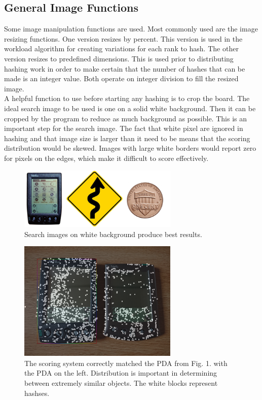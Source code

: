 \documentclass[10pt, journal]{vgtc}                %
\newcommand\tab[1][1cm]{\hspace*{#1}}
\begin{document}
\subsection{General Image Functions}

\tab Some image manipulation functions are used. Most commonly used are the image resizing functions. One version resizes by percent. This version is used in the workload algorithm for creating variations for each rank to hash. The other version resizes to predefined dimensions. This is used prior to distributing hashing work in order to make certain that the number of hashes that can be made is an integer value. Both operate on integer division to fill the resized image.\smallskip \\
\tab A helpful function to use before starting any hashing is to crop the board. The ideal search image to be used is one on a solid white background. Then it can be cropped by the program to reduce as much background as possible. This is an important step for the search image. The fact that white pixel are ignored in hashing and that image size is larger than it need to be means that the scoring distribution would be skewed. Images with large white borders would report zero for pixels on the edges, which make it difficult to score effectively.
\begin{figure}[h!]
	\centering
	\includegraphics[width=3in]{palm3.png}
	\caption{Search images on white background produce best results.}
\end{figure}

\begin{figure}[h!]
	\centering
	\includegraphics[width=3.0in]{overlay_pda.png}
	\caption[White boxes represent hash blocks]{The scoring system correctly matched the PDA from Fig. 1. with the PDA on the left. Distribution is important in determining between extremely similar objects. The white blocks represent hashses.}
\end{figure}
\end{document}
